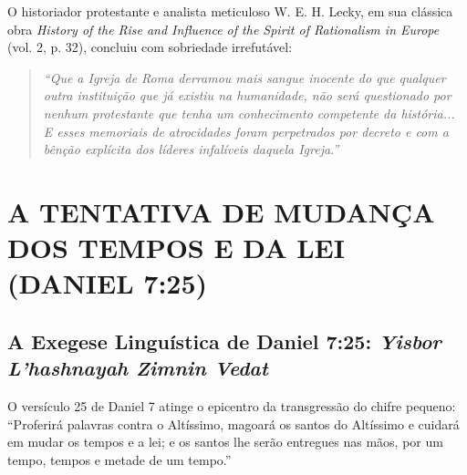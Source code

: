 \documentclass[11pt,a4paper,openany]{book}
\begin{document}
O historiador protestante e analista meticuloso W. E. H. Lecky, em sua clássica obra \textit{History of the Rise and Influence of the Spirit of Rationalism in Europe} (vol. 2, p. 32), concluiu com sobriedade irrefutável:


\begin{quote}
\itshape ``Que a Igreja de Roma derramou mais sangue inocente do que qualquer outra instituição que já existiu na humanidade, não será questionado por nenhum protestante que tenha um conhecimento competente da história... E esses memoriais de atrocidades foram perpetrados por decreto e com a bênção explícita dos líderes infalíveis daquela Igreja.''
\end{quote}




\section{A TENTATIVA DE MUDANÇA DOS TEMPOS E DA LEI (DANIEL 7:25)}



\subsection{A Exegese Linguística de Daniel 7:25: \textit{Yisbor L’hashnayah Zimnin Vedat}}


O versículo 25 de Daniel 7 atinge o epicentro da transgressão do chifre pequeno: ``Proferirá palavras contra o Altíssimo, magoará os santos do Altíssimo e cuidará em mudar os tempos e a lei; e os santos lhe serão entregues nas mãos, por um tempo, tempos e metade de um tempo.''
\end{document}
